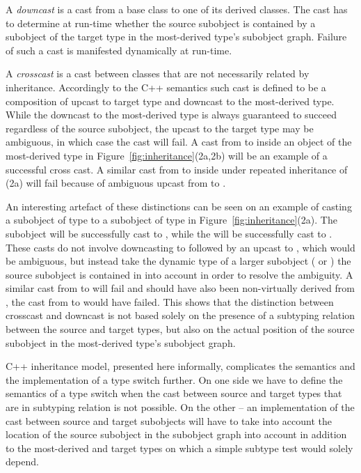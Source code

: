 A \emph{downcast} is a cast from a base class to one of its derived classes. The 
cast has to determine at run-time whether the source subobject is contained by a 
subobject of the target type in the most-derived type's subobject graph. Failure 
of such a cast is manifested dynamically at run-time.

A \emph{crosscast} is a cast between classes that are not necessarily related by 
inheritance. Accordingly to the C++ semantics such cast is defined to be a 
composition of upcast to target type and downcast to the most-derived type. 
While the downcast to the most-derived type is always guaranteed to succeed 
regardless of the source subobject, the upcast to the target type may be 
ambiguous, in which case the cast will fail. A cast from  to  
inside an object of the most-derived type  in 
Figure~\ref{fig:inheritance}(2a,2b) will be an example of a successful cross 
cast. A similar cast from  to  inside  under repeated 
inheritance of (2a) will fail because of ambiguous upcast from  to 
.

An interesting artefact of these distinctions can be seen on an example of 
casting a subobject of type  to a subobject of type  in 
Figure~\ref{fig:inheritance}(2a). The subobject  will be 
successfully cast to , while the  will be 
successfully cast to . These casts do not involve downcasting to 
 followed by an upcast to , which would be ambiguous, but 
instead take the dynamic type of a larger subobject ( or ) 
the source subobject is contained in into account in order to resolve the 
ambiguity. A similar cast from  to  will fail and should 
 have also been non-virtually derived from , the cast from 
 to  would have failed. This shows that the distinction 
between crosscast and downcast is not based solely on the presence of a 
subtyping relation between the source and target types, but also on the actual 
position of the source subobject in the most-derived type's subobject graph.

C++ inheritance model, presented here informally, complicates the semantics and 
the implementation of a type switch further. On one side we have to define the 
semantics of a type switch when the cast between source and target types that 
are in subtyping relation is not possible. On the other -- an implementation of 
the cast between source and target subobjects will have to take into account the 
location of the source subobject in the subobject graph into account in addition 
to the most-derived and target types on which a simple subtype test would solely 
depend.

